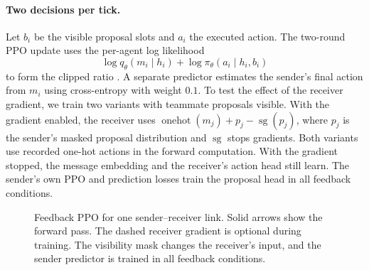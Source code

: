 \documentclass{article}
\begin{document}
\paragraph{Two decisions per tick.}
Let \(b_i\) be the visible proposal slots and \(a_i\) the executed action. The two-round PPO update uses the per-agent log likelihood
\begin{equation}
  \log q_\theta(m_i\mid h_i) + \log \pi_\theta(a_i\mid h_i,b_i)
  \label{eq:logprob}
\end{equation}
to form the clipped ratio \citep{schulman2017ppo,yu2022mappo}. A separate predictor estimates the sender's final action from \(m_i\) using cross-entropy with weight \(0.1\). To test the effect of the receiver gradient, we train two variants with teammate proposals visible. With the gradient enabled, the receiver uses \(\operatorname{onehot}(m_j)+p_j-\operatorname{sg}(p_j)\), where \(p_j\) is the sender's masked proposal distribution and \(\operatorname{sg}\) stops gradients. Both variants use recorded one-hot actions in the forward computation. With the gradient stopped, the message embedding and the receiver's action head still learn. The sender's own PPO and prediction losses train the proposal head in all feedback conditions.

\begin{figure}[H]
  \centering
  \caption{Feedback PPO for one sender--receiver link. Solid arrows show the forward pass. The dashed receiver gradient is optional during training. The visibility mask changes the receiver's input, and the sender predictor is trained in all feedback conditions.}
  \label{fig:receiver}
\end{figure}
\end{document}
